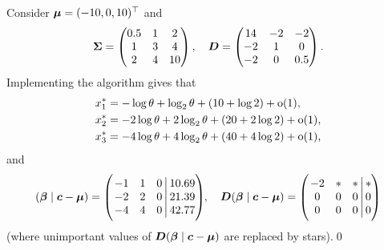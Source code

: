 \begin{example}
Consider $\bm{\mu}=(-10,0, 10)^\top$ and
\[ \bm{\Sigma} = \begin{pmatrix}
            0.5 & 1 & 2 \\
            1 & 3 & 4 \\
            2 & 4 & 10
        \end{pmatrix}, \quad
        \bm{D}  = \begin{pmatrix}
            14 & -2 & -2 \\
            -2 & 1 & 0 \\
            -2 & 0 & 0.5
        \end{pmatrix} . \]
Implementing the algorithm gives that
\begin{align*}
    x_1^* &= -\log \theta + \log_2 \theta +(10 +\log 2) + {\mathrm{o}}(1) , \\
    x_2^* &= -2 \log \theta + 2 \log_2 \theta + (20 + 2\log 2) + {\mathrm{o}}(1) , \\
    x_3^* &= -4 \log \theta + 4 \log_2 \theta + (40 + 4\log 2) + {\mathrm{o}}(1) ,
\end{align*}
and
\[
(\bm{\beta} \mid \bm{c}-\bm{\mu}) = \left(\left.\begin{matrix}
            -1 & 1 & 0\, \\
            -2 & 2 & 0\, \\
            -4 & 4 & 0\,
        \end{matrix}\right|
        \begin{matrix}10.69\\21.39\\42.77\end{matrix}\right)\negmedspace ,\quad
    \bm{D} (\bm{\beta} \mid \bm{c}-\bm{\mu}) = \left(\left.\begin{matrix}
            -2 & * & *\, \\
            0 & 0 & 0\, \\
            0 & 0 & 0\,
    \end{matrix}\right|
    \begin{matrix}*\\0\\0\end{matrix}\right)
\]
(where unimportant values of $\bm{D} (\bm{\beta} \mid \bm{c}-\bm{\mu})$ are replaced by
stars).\qed
\end{example}

